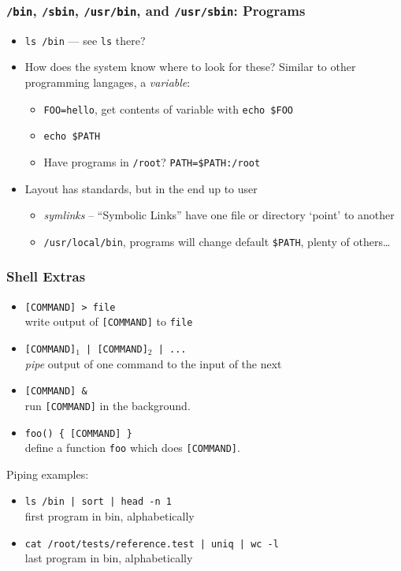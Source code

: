 \documentclass{beamer} \usetheme{Madrid}
\begin{document}
\begin{frame}
    \frametitle{\texttt{/bin}, \texttt{/sbin}, \texttt{/usr/bin}, and \texttt{/usr/sbin}: Programs}
    \begin{itemize}
        \item \texttt{ls /bin} --- see \texttt{ls} there?
        \item How does the system know where to look for these? Similar to other programming langages, a \emph{variable}:
            \begin{itemize}
                \item \texttt{FOO=hello}, get contents of variable with \texttt{echo \$FOO}
                \item \texttt{echo \$PATH}
                \item Have programs in \texttt{/root}? \texttt{PATH=\$PATH:/root}
            \end{itemize}
        \item Layout has standards, but in the end up to user
            \begin{itemize}
                \item \emph{symlinks} -- ``Symbolic Links'' have one file or directory `point' to another
                \item \texttt{/usr/local/bin}, programs will change default \texttt{\$PATH}, plenty of others\ldots
            \end{itemize}
    \end{itemize}
\end{frame}

\begin{frame}
    \frametitle{Shell Extras}
    \begin{itemize}
        \item \texttt{[COMMAND] > file} \\ write output of \texttt{[COMMAND]} to \texttt{file}
        \item \texttt{[COMMAND]$_1$ | [COMMAND]$_2$ | ...} \\ \emph{pipe} output of one command to the input of the next
        \item \texttt{[COMMAND] \&} \\ run \texttt{[COMMAND]} in the background.
        \item \texttt{foo() \{ [COMMAND] \}} \\ define a function \texttt{foo} which does \texttt{[COMMAND]}.
    \end{itemize}
    Piping examples:
    \begin{itemize}
        \item \texttt{ls /bin | sort | head -n 1} \\ first program in bin, alphabetically
        \item \texttt{cat /root/tests/reference.test | uniq | wc -l} \\ last program in bin, alphabetically
    \end{itemize}
\end{frame}
\end{document}
